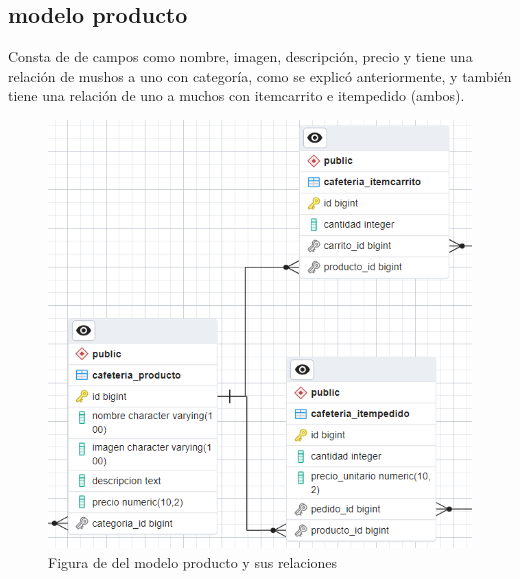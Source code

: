 \documentclass{article}
\begin{document}
	\subsection{modelo producto}
	Consta de de campos como nombre, imagen, descripción, precio y tiene una relación de mushos a uno con categoría, como se explicó anteriormente, y también tiene una relación de uno a muchos con itemcarrito e itempedido (ambos).
	\begin{figure}[h!]
		\centering
		\includegraphics[width=.5\linewidth]{img/modProducto}
		\caption{Figura de del modelo producto y sus relaciones}
		\label{fig:modproducto}
	\end{figure}
	\newpage
\end{document}
